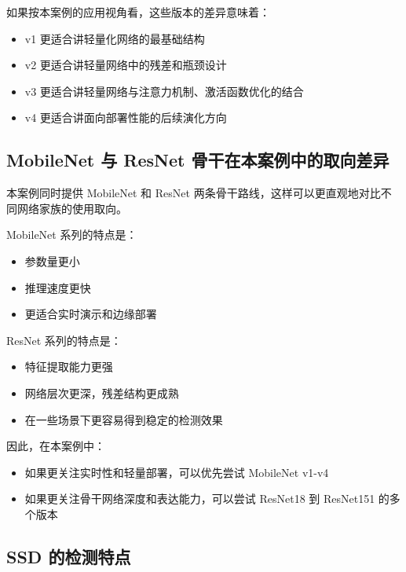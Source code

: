 如果按本案例的应用视角看，这些版本的差异意味着：

\begin{itemize}
\tightlist
\item
  v1 更适合讲轻量化网络的最基础结构
\item
  v2 更适合讲轻量网络中的残差和瓶颈设计
\item
  v3 更适合讲轻量网络与注意力机制、激活函数优化的结合
\item
  v4 更适合讲面向部署性能的后续演化方向
\end{itemize}

\subsection{MobileNet 与 ResNet
骨干在本案例中的取向差异}\label{src-experiment-case2-h14}

本案例同时提供 MobileNet 和 ResNet
两条骨干路线，这样可以更直观地对比不同网络家族的使用取向。

MobileNet 系列的特点是：

\begin{itemize}
\tightlist
\item
  参数量更小
\item
  推理速度更快
\item
  更适合实时演示和边缘部署
\end{itemize}

ResNet 系列的特点是：

\begin{itemize}
\tightlist
\item
  特征提取能力更强
\item
  网络层次更深，残差结构更成熟
\item
  在一些场景下更容易得到稳定的检测效果
\end{itemize}

因此，在本案例中：

\begin{itemize}
\tightlist
\item
  如果更关注实时性和轻量部署，可以优先尝试 MobileNet v1-v4
\item
  如果更关注骨干网络深度和表达能力，可以尝试 ResNet18 到 ResNet151
  的多个版本
\end{itemize}

\subsection{SSD 的检测特点}\label{src-experiment-case2-h15}

